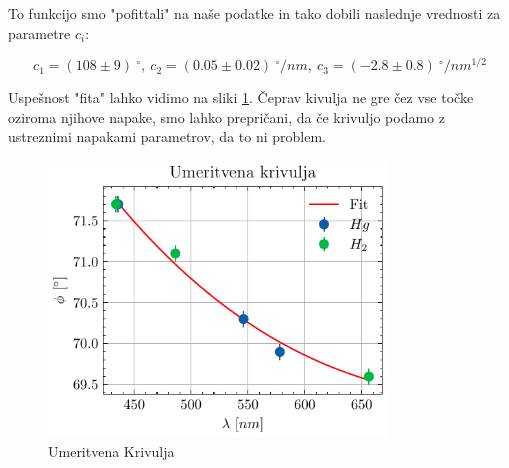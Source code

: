 \documentclass[12pt]{article}
\begin{document}
To funkcijo smo "pofittali" na naše podatke in tako dobili naslednje vrednosti za parametre $c_i$:

\begin{equation*}
    c_1 = (108\pm 9)\ ^{\circ},\ c_2 = (0.05 \pm 0.02)\ ^{\circ}/nm,\ c_3 = (-2.8 \pm 0.8)\ ^{\circ}/nm^{1/2}
\end{equation*}

\noindent Uspešnost "fita" lahko vidimo na sliki \ref{kalibracija}. Čeprav kivulja ne gre čez vse točke oziroma njihove napake, smo lahko prepričani, da če krivuljo podamo z ustreznimi napakami parametrov, da to ni problem.

\begin{figure}[ht]
\begin{center}
    \includegraphics[width=9cm]{kalibracija.pdf}
    \caption{Umeritvena Krivulja}
    \label{kalibracija}
\end{center}
\end{figure}
\end{document}
